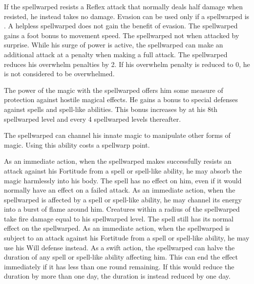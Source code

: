 If the spellwarped resists a Reflex attack that normally deals half damage when resisted, he instead takes no damage.
Evasion can be used only if a spellwarped is \unencumbered.
A helpless spellwarped does not gain the benefit of evasion.
The spellwarped gains a  foot bonus to movement speed.
The spellwarped not \unaware when attacked by surprise.
While his surge of power is active, the spellwarped can make an additional attack at a  penalty when making a full attack.
The spellwarped reduces his overwhelm penalties by 2.
If his overwhelm penalty is reduced to 0, he is not considered to be overwhelmed.

The power of the magic with the spellwarped offers him some measure of protection against hostile magical effects.
He gains a  bonus to special defenses against spells and spell-like abilities.
This bonus increases by  at his 8th spellwarped level and every 4 spellwarped levels thereafter.

The spellwarped can channel his innate magic to manipulate other forms of magic.
Using this ability costs a spellwarp point.

As an immediate action, when the spellwarped makes successfully resists an attack against his Fortitude from a spell or spell-like ability, he may absorb the magic harmlessly into his body.
The spell has no effect on him, even if it would normally have an effect on a failed attack.
As an immediate action, when the spellwarped is affected by a spell or spell-like ability, he may channel its energy into a burst of flame around him.
Creatures within a \areasmall radius of the spellwarped take fire damage equal to his spellwarped level.
The spell still has its normal effect on the spellwarped.
As an immediate action, when the spellwarped is subject to an attack against his Fortitude from a spell or spell-like ability, he may use his Will defense instead.
As a swift action, the spellwarped can halve the duration of any spell or spell-like ability affecting him.
This can end the effect immediately if it has less than one round remaining.
If this would reduce the duration by more than one day, the duration is instead reduced by one day.

